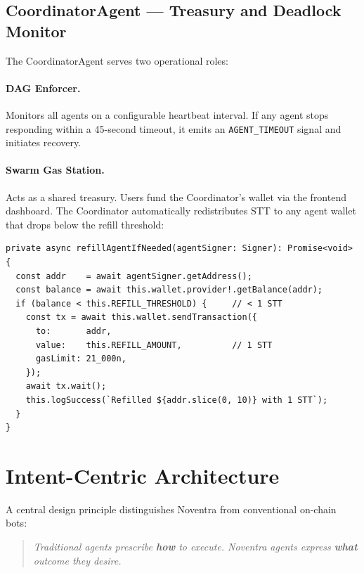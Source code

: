 \documentclass[11pt,a4paper]{article}
\begin{document}
\subsection{CoordinatorAgent --- Treasury and Deadlock Monitor}

The CoordinatorAgent serves two operational roles:

\paragraph{DAG Enforcer.} Monitors all agents on a configurable heartbeat interval.
If any agent stops responding within a 45-second timeout, it emits an
\texttt{AGENT\_TIMEOUT} signal and initiates recovery.

\paragraph{Swarm Gas Station.} Acts as a shared treasury. Users fund the Coordinator's
wallet via the frontend dashboard. The Coordinator automatically redistributes STT to
any agent wallet that drops below the refill threshold:

\begin{lstlisting}[caption=Coordinator Auto-Refill Logic]
private async refillAgentIfNeeded(agentSigner: Signer): Promise<void> {
  const addr    = await agentSigner.getAddress();
  const balance = await this.wallet.provider!.getBalance(addr);
  if (balance < this.REFILL_THRESHOLD) {     // < 1 STT
    const tx = await this.wallet.sendTransaction({
      to:       addr,
      value:    this.REFILL_AMOUNT,          // 1 STT
      gasLimit: 21_000n,
    });
    await tx.wait();
    this.logSuccess(`Refilled ${addr.slice(0, 10)} with 1 STT`);
  }
}
\end{lstlisting}

\section{Intent-Centric Architecture}

A central design principle distinguishes Noventra from conventional on-chain bots:

\begin{quote}
  \textit{Traditional agents prescribe \textbf{how} to execute. Noventra agents express
  \textbf{what} outcome they desire.}
\end{quote}
\end{document}
